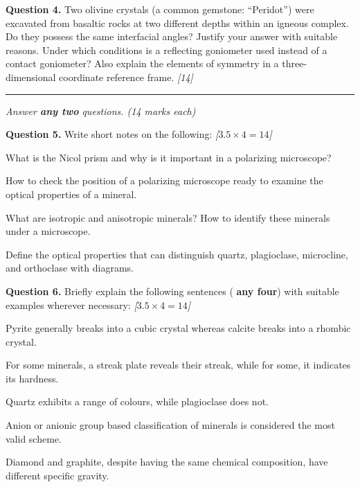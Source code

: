 \documentclass[11pt,a4paper]{article}
\newcommand{\pts}[1]{\hfill   \textit{[#1]}}
\begin{document}
\medskip


\noindent   \textbf{Question 4.} Two olivine crystals (a common gemstone: ``Peridot'') were excavated from basaltic rocks at two different depths within an igneous complex. Do they possess the same interfacial angles? Justify your answer with suitable reasons. Under which conditions is a reflecting goniometer used instead of a contact goniometer? Also explain the elements of symmetry in a three-dimensional coordinate reference frame. \pts{14}

\bigskip


\rule{\linewidth}{0.4pt}\smallskip



\noindent   \textit{Answer   \textbf{any two} questions. (14 marks each)}
\medskip




\noindent   \textbf{Question 5.} Write short notes on the following: \pts{$3.5  \times 4 = 14$}

\begin{parts}
  \item What is the Nicol prism and why is it important in a polarizing microscope?
  \item How to check the position of a polarizing microscope ready to examine the optical properties of a mineral.
  \item What are isotropic and anisotropic minerals? How to identify these minerals under a microscope.
  \item Define the optical properties that can distinguish quartz, plagioclase, microcline, and orthoclase with diagrams.
\end{parts}

\medskip


\noindent   \textbf{Question 6.} Briefly explain the following sentences (   \textbf{any four}) with suitable examples wherever necessary: \pts{$3.5  \times 4 = 14$}

\begin{parts}
  \item Pyrite generally breaks into a cubic crystal whereas calcite breaks into a rhombic crystal.
  \item For some minerals, a streak plate reveals their streak, while for some, it indicates its hardness.
  \item Quartz exhibits a range of colours, while plagioclase does not.
  \item Anion or anionic group based classification of minerals is considered the most valid scheme.
  \item Diamond and graphite, despite having the same chemical composition, have different specific gravity.
\end{parts}
\end{document}
